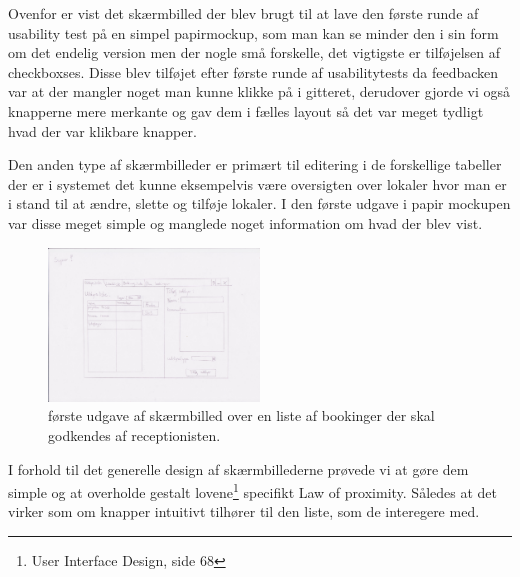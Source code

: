 Ovenfor er vist det skærmbilled der blev brugt til at lave den første runde af usability test på en simpel papirmockup, som man kan se minder den i sin form om det endelig version men der nogle små forskelle, det vigtigste er tilføjelsen af checkboxses. Disse blev tilføjet efter første runde af usabilitytests da feedbacken var at der mangler noget man kunne klikke på i gitteret, derudover gjorde vi også knapperne mere merkante og gav dem i fælles layout så det var meget tydligt hvad der var klikbare knapper.

Den anden type af skærmbilleder er primært til editering i de forskellige tabeller der er i systemet det kunne eksempelvis være oversigten over lokaler hvor man er i stand til at ændre, slette og tilføje lokaler.
I den første udgave i papir mockupen var disse meget simple og manglede noget information om hvad der blev vist.
\begin{figure}[h!]
  \caption{første udgave af skærmbilled over en liste af bookinger der skal godkendes af receptionisten.}
  \centering
    \includegraphics[width=0.5\textwidth]{Appendix/GUI-Prototype/PaperMockup/UdstyrsListe}
\end{figure} 
I forhold til det generelle design af skærmbillederne prøvede vi at gøre dem simple og at overholde gestalt lovene\footnote{User Interface Design, side 68} specifikt Law of proximity. Således at det virker som om knapper intuitivt tilhører til den liste, som de interegere med.




